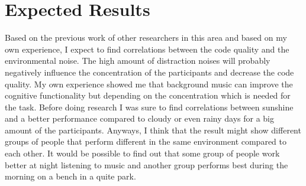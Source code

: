 \section{Expected Results}
Based on the previous work of other researchers in this area and based on my own experience, I expect to find correlations between the code quality and the environmental noise. The high amount of distraction noises will probably negatively influence the concentration of the participants and decrease the code quality. My own experience showed me that background music can improve the cognitive functionality but depending on the concentration which is needed for the task. Before doing research I was sure to find correlations between sunshine and a better performance compared to cloudy or even rainy days for a big amount of the participants. Anyways, I think that the result might show different groups of people that perform different in the same environment compared to each other. It would be possible to find out that some group of people work better at night listening to music and another group performs best during the morning on a bench in a quite park.
